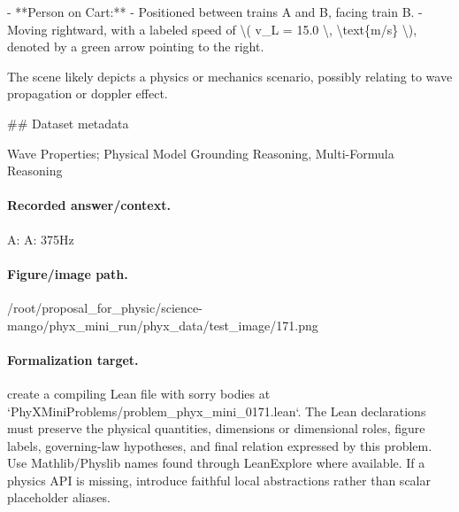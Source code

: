 - **Person on Cart:**
  - Positioned between trains A and B, facing train B.
  - Moving rightward, with a labeled speed of \textbackslash{}( v\_L = 15.0 \textbackslash{}, \textbackslash{}text\{m/s\} \textbackslash{}), denoted by a green arrow pointing to the right.

The scene likely depicts a physics or mechanics scenario, possibly relating to wave propagation or doppler effect.

\#\# Dataset metadata

Wave Properties; Physical Model Grounding Reasoning, Multi-Formula Reasoning

\paragraph{Recorded answer/context.}
A: A: 375Hz

\paragraph{Figure/image path.}
/root/proposal\_for\_physic/science-mango/phyx\_mini\_run/phyx\_data/test\_image/171.png

\paragraph{Formalization target.}
create a compiling Lean file with sorry bodies at `PhyXMiniProblems/problem\_phyx\_mini\_0171.lean`. The Lean declarations must preserve the physical quantities, dimensions or dimensional roles, figure labels, governing-law hypotheses, and final relation expressed by this problem.
Use Mathlib/Physlib names found through LeanExplore where available. If a physics API is missing, introduce faithful local abstractions rather than scalar placeholder aliases.

